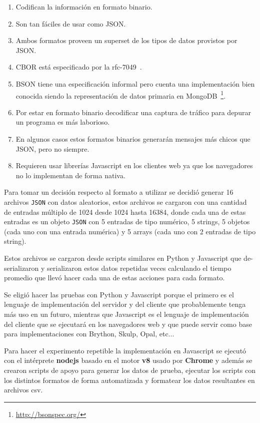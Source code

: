 \begin{enumerate}
    \item Codifican la información en formato binario.
    \item Son tan fáciles de usar como JSON.
    \item Ambos formatos proveen un superset de los tipos de datos provistos
        por JSON.
    \item CBOR está especificado por la rfc-7049~\citep{rfc-7049}.
    \item BSON tiene una especificación informal pero cuenta una
        implementación bien conocida siendo la representación de datos primaria en
        MongoDB~\footnote{\url{http://bsonspec.org/}}.
    \item Por estar en formato binario decodificar una captura de tráfico
        para depurar un programa es más laborioso.
    \item En algunos casos estos formatos binarios generarán mensajes más
        chicos que JSON, pero no siempre.
    \item Requieren usar librerías Javascript en los clientes web ya que los
        navegadores no lo implementan de forma nativa.
\end{enumerate}

Para tomar un decisión respecto al formato a utilizar se decidió generar
16 archivos \texttt{JSON} con datos aleatorios, estos archivos se cargaron
con una cantidad de entradas múltiplo de 1024 desde 1024 hasta 16384, donde
cada una de estas entradas es un objeto \texttt{JSON} con 5 entradas de tipo
numérico, 5 strings, 5 objetos (cada uno con una entrada numérica) y 5
arrays (cada uno con 2 entradas de tipo string).

Estos archivos se cargaron desde scripts similares en Python y Javascript que
de-serializaron y serializaron estos datos repetidas veces calculando el tiempo
promedio que llevó hacer cada una de estas acciones para cada formato.

Se eligió hacer las pruebas con Python y Javascript porque el primero es el
lenguaje de implementación del servidor y del cliente que probablemente tenga
más uso en un futuro, mientras que Javascript es el lenguaje de implementación
del cliente que se ejecutará en los navegadores web y que puede servir como
base para implementaciones con Brython, Skulp, Opal, etc...

Para hacer el experimento repetible la implementación en
Javascript se ejecutó con el intérprete \textbf{nodejs} basado en
el motor \textbf{v8} usado por \textbf{Chrome} y además se crearon
scripts de apoyo para generar los datos de prueba, ejecutar los scripts
con los distintos formatos de forma automatizada y formatear los datos
resultantes en archivos csv.

